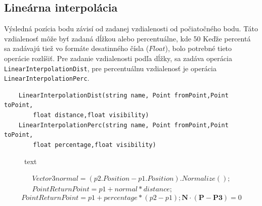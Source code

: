 \subsection{Lineárna interpolácia}
Výsledná pozícia bodu závisí od zadanej vzdialenosti od počiatočného bodu. Táto vzdialenosť môže byť zadaná dĺžkou alebo percentuálne, kde 50%
Keďže percentá sa zadávajú tiež vo formáte desatinného čísla ($Float$), bolo potrebné tieto operácie rozlíšiť. Pre zadanie vzdialenosti podľa dĺžky, sa zadáva operácia \texttt{LinearInterpolationDist}, 
pre percentuálnu vzdialenosť je operácia \texttt{LinearInterpolationPerc}.
\begin{lstlisting}
    LinearInterpolationDist(string name, Point fromPoint,Point toPoint,
        float distance,float visibility)
    LinearInterpolationPerc(string name, Point fromPoint,Point toPoint,
        float percentage,float visibility)
\end{lstlisting}

\begin{figure}[H]
	\centering
	\caption{text}
	\label{fig:1}
\end{figure}


\begin{equation}
\begin{split}
    Vector3 normal = (p2.Position - p1.Position).Normalize();
    \\
	Point ReturnPoint = p1 + normal * distance;
	\label{eq:LiearnInterpolationDist}
\end{split}
\end{equation}
\begin{equation}
    Point ReturnPoint = p1 + percentage * (p2 - p1);
    \textbf{N} \cdot (\textbf{P} - \textbf{P3}) = 0
	\label{eq:LiearnInterpolationPerc}
\end{equation}


